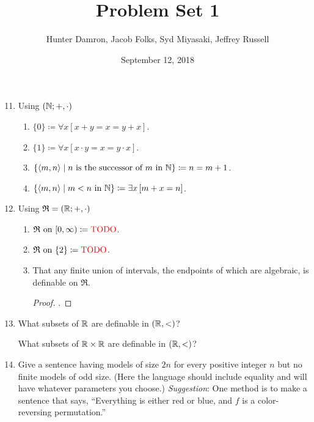 \documentclass{homework}
\title{Problem Set 1}
\author{Hunter Damron, Jacob Folks, Syd Miyasaki, Jeffrey Russell}
\date{September 12, 2018}
\begin{document}
	\maketitle
	\begin{enumerate}
		\setcounter{enumi}{10}
		\item Using $(\mathbb{N}; +, \cdot)$
		\begin{enumerate}
			\item $\{0\} \coloneqq \forall x \left[x + y = x = y + x\right]$.
			\item $\{1\} \coloneqq \forall x \left[x \cdot y = x = y \cdot x \right]$.
			\item $\{\langle m,n \rangle \mid n \text{ is the successor of } m \text{ in } \mathbb{N}\} \coloneqq n = m + 1$.
			\item $\{\langle m,n \rangle \mid m < n \text{ in } \mathbb{N}\} \coloneqq \exists x \left[m + x = n\right]$.
		\end{enumerate}
		\item Using $\mathfrak{R} = (\mathbb{R}; +, \cdot)$
		\begin{enumerate}
			\item $\mathfrak{R} \text{ on } [0, \infty) \coloneqq \TODO$.
			\item $\mathfrak{R} \text{ on } \{2\} \coloneqq \TODO$.
			\item That any finite union of intervals, the endpoints of which are algebraic, is definable on $\mathfrak{R}$.
			\begin{proof}
				\TODO.
			\end{proof}
		\end{enumerate}
		
		\setcounter{enumi}{13}
		\item What subsets of $\mathbb{R}$ are definable in $(\mathbb{R}, <)$? \TODO
		
		What subsets of $\mathbb{R}\times\mathbb{R}$ are definable in $(\mathbb{R}, <)$? \TODO
		
		\setcounter{enumi}{15}
		\item Give a sentence having models of size $2n$ for every positive integer $n$ but no finite models of odd size. (Here the language should include equality and will have whatever parameters you choose.) \emph{Suggestion}: One method is to make a sentence that says, ``Everything is either red or blue, and $f$ is a color-reversing permutation.''
		
		\TODO
	\end{enumerate}
\end{document}
